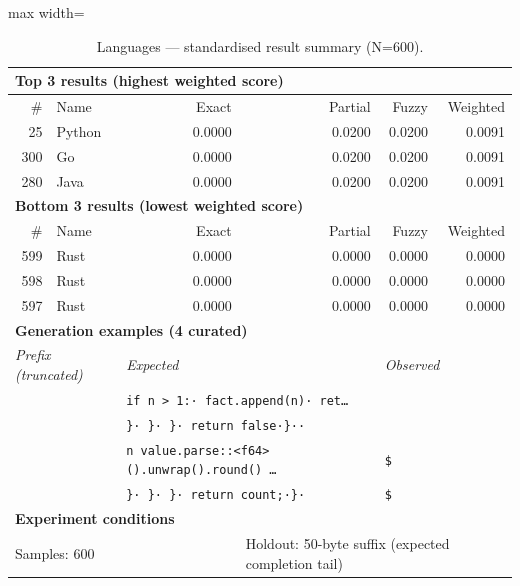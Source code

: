 \begin{table}[htbp]
\centering
\caption{Languages — standardised result summary (N=600).}
\label{tab:languages_summary}
\begin{adjustbox}{max width=\textwidth}
\begin{tabular}{r p{5cm} r r r r}
\toprule
\multicolumn{6}{l}{\textbf{Top 3 results (highest weighted score)}} \\
\midrule
\# & Name & Exact & Partial & Fuzzy & Weighted \\
\midrule
25 & Python & 0.0000 & 0.0200 & 0.0200 & 0.0091 \\
300 & Go & 0.0000 & 0.0200 & 0.0200 & 0.0091 \\
280 & Java & 0.0000 & 0.0200 & 0.0200 & 0.0091 \\
\midrule
\multicolumn{6}{l}{\textbf{Bottom 3 results (lowest weighted score)}} \\
\midrule
\# & Name & Exact & Partial & Fuzzy & Weighted \\
\midrule
599 & Rust & 0.0000 & 0.0000 & 0.0000 & 0.0000 \\
598 & Rust & 0.0000 & 0.0000 & 0.0000 & 0.0000 \\
597 & Rust & 0.0000 & 0.0000 & 0.0000 & 0.0000 \\
\midrule
\multicolumn{6}{l}{\textbf{Generation examples (4 curated)}} \\
\midrule
\multicolumn{2}{l}{\textit{Prefix (truncated)}} & \multicolumn{2}{l}{\textit{Expected}} & \multicolumn{2}{l}{\textit{Observed}} \\
\midrule
\multicolumn{2}{l}{\texttt{}} & \multicolumn{2}{l}{\texttt{if n > 1:·        fact.append(n)·    ret\ldots}} & \multicolumn{2}{l}{\texttt{}} \\
\multicolumn{2}{l}{\texttt{}} & \multicolumn{2}{l}{\texttt{\}·        \}·    \}·    return false·\}··}} & \multicolumn{2}{l}{\texttt{}} \\
\multicolumn{2}{l}{\texttt{}} & \multicolumn{2}{l}{\texttt{n value.parse::<f64>().unwrap().round() \ldots}} & \multicolumn{2}{l}{\texttt{\$}} \\
\multicolumn{2}{l}{\texttt{}} & \multicolumn{2}{l}{\texttt{\}·        \}·    \}·    return count;·\}·}} & \multicolumn{2}{l}{\texttt{\$}} \\
\midrule
\multicolumn{6}{l}{\textbf{Experiment conditions}} \\
\midrule
\multicolumn{3}{l}{Samples: 600} & \multicolumn{3}{l}{Holdout: 50-byte suffix (expected completion tail)} \\

\end{tabular}
\end{adjustbox}
\end{table}
